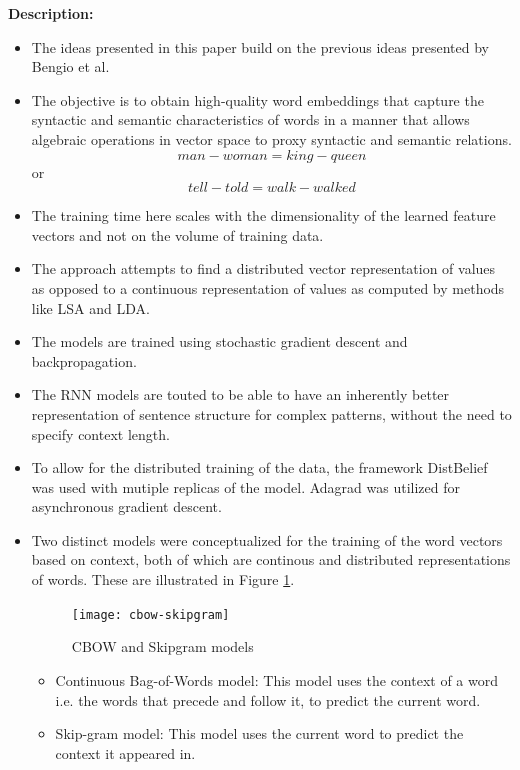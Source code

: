 \documentclass[11pt,a4paper]{article}
\begin{document}
  \textbf{Description:}
  \begin{itemize}
    \item
    The ideas presented in this paper build on the previous ideas presented by Bengio et al.\cite{bengio2003neural}
    \item
    The objective is to obtain high-quality word embeddings that capture the syntactic and semantic characteristics of words in a manner that allows algebraic operations in vector space to proxy syntactic and semantic relations.
    $$man - woman = king - queen$$ or $$tell - told = walk - walked$$
    \item
    The training time here scales with the dimensionality of the learned feature vectors and not on the volume of training data.
    \item
    The approach attempts to find a distributed vector representation of values as opposed to a continuous representation of values as computed by methods like LSA and LDA.
    \item
    The models are trained using stochastic gradient descent and backpropagation.
    \item
    The RNN models are touted to be able to have an inherently better representation of sentence structure for complex patterns, without the need to specify context length.
    \item
    To allow for the distributed training of the data, the framework DistBelief was used with mutiple replicas of the model. Adagrad was utilized for asynchronous gradient descent.
    \item
    Two distinct models were conceptualized for the training of the word vectors based on context, both of which are continous and distributed representations of words. These are illustrated in Figure \ref{fig:cbow-skipgram}.
    \begin{figure}[ht]
      \centering
      \texttt{[image: cbow-skipgram]}
      \caption{CBOW and Skipgram models}
      \label{fig:cbow-skipgram}
    \end{figure}
    \begin{itemize}
      \item
      Continuous Bag-of-Words model: This model uses the context of a word i.e. the words that precede and follow it, to predict the current word.
      \item
      Skip-gram model: This model uses the current word to predict the context it appeared in.
    \end{itemize}
  \end{itemize}
\end{document}
